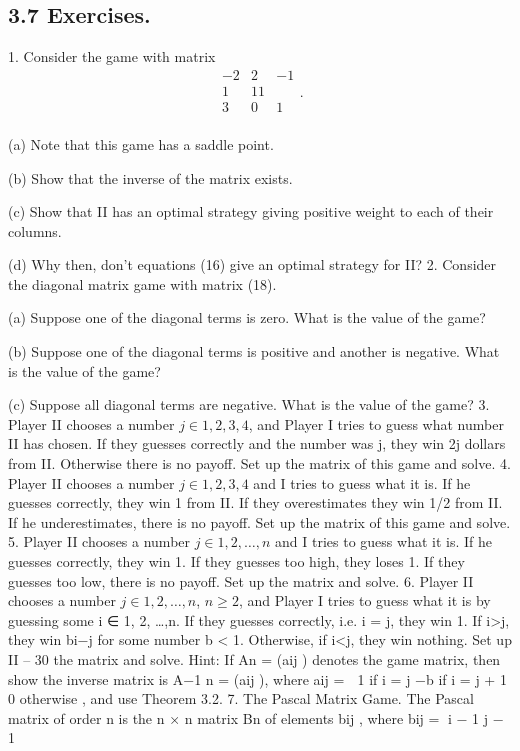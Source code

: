 \documentclass[]{report}
\begin{document}
\subsection{3.7 Exercises.}
1. Consider the game with matrix
\[\begin{array}{ccc}
−2 & 2 & −1\\
1& 1 1\\
3& 0& 1 \\
\end{array}.\]

\item[(a)] Note that this game has a saddle point.
\item[(b)] Show that the inverse of the matrix exists.
\item[(c)] Show that II has an optimal strategy giving positive weight to each of their columns.
\item[(d)] Why then, don’t equations (16) give an optimal strategy for II?
2. Consider the diagonal matrix game with matrix (18).
\item[(a)] Suppose one of the diagonal terms is zero. What is the value of the game?
\item[(b)] Suppose one of the diagonal terms is positive and another is negative. What is
the value of the game?
\item[(c)] Suppose all diagonal terms are negative. What is the value of the game?
3. Player II chooses a number $j \in {1, 2, 3, 4}$, and Player I tries to guess what number
II has chosen. If they guesses correctly and the number was j, they win  2j dollars from II.
Otherwise there is no payoff. Set up the matrix of this game and solve.
4. Player II chooses a number $j \in {1, 2, 3, 4}$ and I tries to guess what it is. If
he guesses correctly, they win  1 from II. If they overestimates they win  1/2 from II. If he
underestimates, there is no payoff. Set up the matrix of this game and solve.
5. Player II chooses a number $j \in {1, 2,\ldots,n}$ and I tries to guess what it is. If he
guesses correctly, they win  1. If they guesses too high, they loses 1. If they guesses too low, there
is no payoff. Set up the matrix and solve.
6. Player II chooses a number $j \in {1, 2,\ldots,n}$, $n \geq 2$, and Player I tries to guess
what it is by guessing some i ∈ {1, 2, \ldots,n}. If they guesses correctly, i.e. i = j, they win  1.
If i>j, they win  bi−j for some number b < 1. Otherwise, if i<j, they win  nothing. Set up
II – 30
the matrix and solve. Hint: If An = (aij ) denotes the game matrix, then show the inverse
matrix is A−1
n = (aij ), where aij =
 1 if i = j
−b if i = j + 1
0 otherwise
, and use Theorem 3.2.
7. The Pascal Matrix Game. The Pascal matrix of order n is the n × n matrix
Bn of elements bij , where
bij =
i − 1
j − 1
\end{document}
